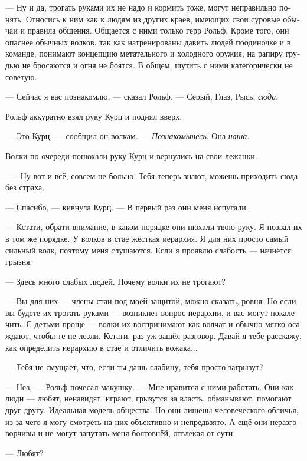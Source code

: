 \documentclass[a4paper,12pt,fleqn]{book}\usepackage{polyglossia}\setdefaultlanguage[babelshorthands=true]{russian}\setotherlanguage{english}\defaultfontfeatures{Ligatures=TeX,Mapping=tex-text}\usepackage{xcolor}\newcommand{\ml}[3]{#2}
\newcommand{\asterism}{\vspace{1em}{\centering\Large\bfseries$\ast~\ast~\ast$\par}\vspace{1em}}
\begin{document}
--- Ну и да, трогать руками их не надо и кормить тоже, могут неправильно понять.
Относись к ним как к людям из других краёв, имеющих свои суровые обычаи и правила общения.
Общается с ними только герр Рольф.
Кроме того, они опаснее обычных волков, так как натренированы давить людей поодиночке и в команде, понимают концепцию метательного и холодного оружия, на рапиру грудью не бросаются и огня не боятся.
В общем, шутить с ними категорически не советую. 

\asterism

--- Сейчас я вас познакомлю, --- сказал Рольф.
--- Серый, Глаз, Рысь, \textit{сюда}.

Рольф аккуратно взял руку Курц и поднял вверх.

--- Это Курц, --- сообщил он волкам.
--- \textit{Познакомьтесь}.
Она \textit{наша}.

Волки по очереди понюхали руку Курц и вернулись на свои лежанки.

--— Ну вот и всё, совсем не больно.
Тебя теперь знают, можешь приходить сюда без страха.

--- Спасибо, --- кивнула Курц.
--- В первый раз они меня испугали.

--- Кстати, обрати внимание, в каком порядке они нюхали твою руку.
Я позвал их в том же порядке.
У волков в стае жёсткая иерархия.
Я для них просто самый сильный волк, поэтому меня слушаются.
Если я проявлю слабость --- начнётся грызня.

--- Здесь много слабых людей.
Почему волки их не трогают?

--- Вы для них --- члены стаи под моей защитой, можно сказать, ровня.
Но если вы будете их трогать руками --- возникнет вопрос иерархии, и вас могут покалечить.
С детьми проще --- волки их воспринимают как волчат и обычно мягко осаждают, чтобы те не лезли.
Кстати, раз уж зашёл разговор.
Давай я тебе расскажу, как определить иерархию в стае и отличить вожака...

\asterism

--- Тебя не смущает, что, если ты дашь слабину, тебя просто загрызут?

--- Неа, --- Рольф почесал макушку.
--- Мне нравится с ними работать.
Они как люди --- любят, ненавидят, играют, грызутся за власть, обманывают, помогают друг другу.
Идеальная модель общества.
Но они лишены человеческого обличья, из-за чего я могу смотреть на них объективно и непредвзято.
А ещё они неразговорчивы и не могут запутать меня болтовнёй, отвлекая от сути.

--- Любят?
\end{document}
